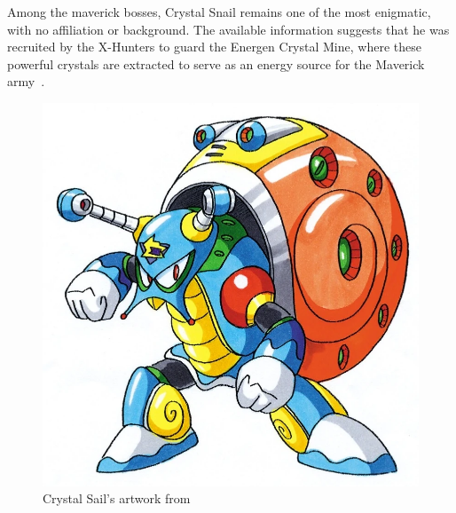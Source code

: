 Among the maverick bosses, Crystal Snail remains one of the most enigmatic, with no affiliation or background. The available information suggests that he was recruited by the X-Hunters to guard the Energen Crystal Mine, where these powerful crystals are extracted to serve as an energy source for the Maverick army~\cite{wayback:X2_resources}.\begin{figure}[htp]
	\centering
	\includegraphics[height=\portraitsize]{figures/X2/Crystal_snail/Crystal_Snail.png}
	\caption{Crystal Sail's artwork from \cite{book:MMX_Complete_art}}
\end{figure}
